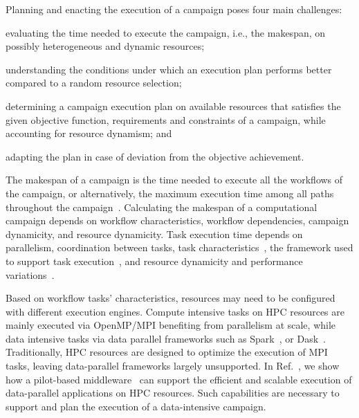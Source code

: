 Planning and enacting the execution of a campaign poses four main challenges: 
\begin{inparaenum}[(i)]
\item evaluating the time needed to execute the campaign, i.e., the makespan, on possibly heterogeneous and dynamic resources;
\item understanding the conditions under which an execution plan performs better compared to a random resource selection;
\item determining a campaign execution plan on available resources that satisfies the given objective function, requirements and constraints of a campaign, while accounting for resource dynamism; and
\item adapting the plan in case of deviation from the objective achievement.
\end{inparaenum}

The makespan of a campaign is the time needed to execute all the workflows of the campaign, or alternatively, the maximum execution time among all paths throughout the campaign~\cite{chirkin2017execution}.
Calculating the makespan of a computational campaign depends on workflow characteristics, workflow dependencies, campaign dynamicity, and resource dynamicity.
Task execution time depends on parallelism, coordination between tasks, task characteristics~\cite{khoshlessan2017parallel}, the framework used to support task execution~\cite{paraskevakos2018task}, and resource dynamicity and performance variations~\cite{paraskevakos2019workflow, pouchard2019computational}.

Based on workflow tasks’ characteristics, resources may need to be configured with different execution engines.
Compute intensive tasks on HPC resources are mainly executed via OpenMP/MPI benefiting from parallelism at scale, while data intensive tasks via data parallel frameworks such as Spark~\cite{zaharia2010spark}, or Dask~\cite{rocklin2015dask}.
Traditionally, HPC resources are designed to optimize the execution of MPI tasks, leaving data-parallel frameworks largely unsupported.
In Ref.~\cite{luckow2016hadoop}, we show how a pilot-based middleware~\cite{merzky2019using} can support the efficient and scalable execution of data-parallel applications on HPC resources.
Such capabilities are necessary to support and plan the execution of a data-intensive campaign.

